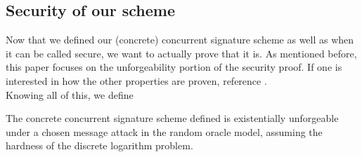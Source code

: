 \subsection{Security of our scheme}\label{concretesec}
  Now that we defined our (concrete) concurrent signature scheme as well as when it can be called secure, we want to actually prove that it is.
  As mentioned before, this paper focuses on the unforgeability portion of the security proof.
  If one is interested in how the other properties are proven, reference \cite{chen2004concurrent}.\\
  Knowing all of this, we define
  \begin{lemma}\label{unforgeablelemma}
    The concrete concurrent signature scheme defined is existentially unforgeable under a chosen message attack in the random oracle model, assuming the hardness of the discrete logarithm problem.
  \end{lemma}